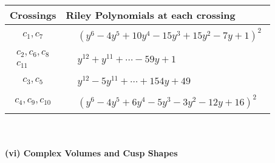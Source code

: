 \documentclass[1p]{elsarticle_modified}
\theoremstyle{definition}
\begin{document}
\begin{tabular}{m{50pt}|m{274pt}}
Crossings & \hspace{64pt}Riley Polynomials at each crossing \\
\hline $$\begin{aligned}c_{1},c_{7}\end{aligned}$$&$\begin{aligned}
&(y^6-4 y^5+10 y^4-15 y^3+15 y^2-7 y+1)^2
\end{aligned}$\\
\hline $$\begin{aligned}c_{2},c_{6},c_{8}\\c_{11}\end{aligned}$$&$\begin{aligned}
&y^{12}+y^{11}+\cdots-59 y+1
\end{aligned}$\\
\hline $$\begin{aligned}c_{3},c_{5}\end{aligned}$$&$\begin{aligned}
&y^{12}-5 y^{11}+\cdots+154 y+49
\end{aligned}$\\
\hline $$\begin{aligned}c_{4},c_{9},c_{10}\end{aligned}$$&$\begin{aligned}
&(y^6-4 y^5+6 y^4-5 y^3-3 y^2-12 y+16)^2
\end{aligned}$\\
\hline
\end{tabular}\\~\\
\newpage\flushleft \textbf{(vi) Complex Volumes and Cusp Shapes}
\end{document}
